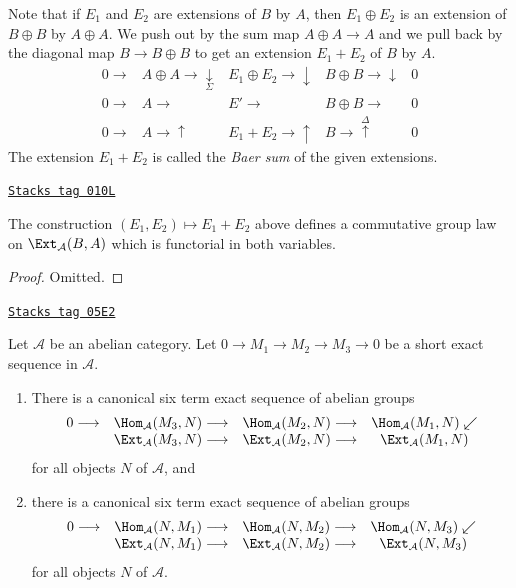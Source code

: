 \medskip\noindent
Note that if $E_1$ and $E_2$ are extensions of
$B$ by $A$, then $E_1\oplus E_2$ is an extension
of $B \oplus B$ by $A\oplus A$. We
push out by the sum map $A \oplus A \to A$ and we
pull back by the diagonal map $B \to B \oplus B$ to get
an extension $E_1 + E_2$ of $B$ by $A$.
$$
\begin{array}{ccccc}0 \longrightarrow & A \oplus A \longrightarrow\underset{\Sigma}{\downarrow} & E_1 \oplus E_2 \longrightarrow\downarrow & B \oplus B \longrightarrow\downarrow & 0 \\ 0 \longrightarrow & A \longrightarrow & E' \longrightarrow & B \oplus B \longrightarrow & 0 \\ 0 \longrightarrow & A \longrightarrow\uparrow & E_1 + E_2 \longrightarrow\uparrow & B \longrightarrow\overset{\Delta}{\uparrow} & 0\end{array}
$$
The extension $E_1 + E_2$ is called the {\it Baer sum} of the
given extensions.

\begin{lemma}
\label{homology-lemma-baer-sum}
\href{https://stacks.math.columbia.edu/tag/010L}{\texttt{Stacks tag 010L}}

The construction $(E_1, E_2) \mapsto E_1 + E_2$
above defines a commutative group
law on $\Ext_\mathcal{A}(B, A)$ which is
functorial in both variables.
\end{lemma}

\begin{proof}
Omitted.
\end{proof}

\begin{lemma}
\label{homology-lemma-six-term-sequence-ext}
\href{https://stacks.math.columbia.edu/tag/05E2}{\texttt{Stacks tag 05E2}}

Let $\mathcal{A}$ be an abelian category.
Let $0 \to M_1 \to M_2 \to M_3 \to 0$ be a short exact sequence
in $\mathcal{A}$.
\begin{enumerate}
\item There is a canonical six term exact sequence of abelian groups
$$
\begin{array}{cccc}0 \longrightarrow & \Hom_\mathcal{A}(M_3, N) \longrightarrow & \Hom_\mathcal{A}(M_2, N) \longrightarrow & \Hom_\mathcal{A}(M_1, N) \swarrow \\  & \Ext_\mathcal{A}(M_3, N) \longrightarrow & \Ext_\mathcal{A}(M_2, N) \longrightarrow & \Ext_\mathcal{A}(M_1, N)\end{array}
$$
for all objects $N$ of $\mathcal{A}$, and
\item there is a canonical six term exact sequence of abelian groups
$$
\begin{array}{cccc}0 \longrightarrow & \Hom_\mathcal{A}(N, M_1) \longrightarrow & \Hom_\mathcal{A}(N, M_2) \longrightarrow & \Hom_\mathcal{A}(N, M_3) \swarrow \\  & \Ext_\mathcal{A}(N, M_1) \longrightarrow & \Ext_\mathcal{A}(N, M_2) \longrightarrow & \Ext_\mathcal{A}(N, M_3)\end{array}
$$
for all objects $N$ of $\mathcal{A}$.
\end{enumerate}
\end{lemma}

